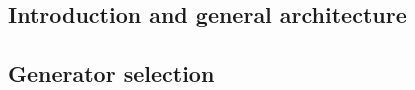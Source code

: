 \documentclass[../TFG_Report.tex]{subfiles}
\begin{document}
	
	\subsection{Introduction and general architecture}
	
	
	
	\subsection{Generator selection}
	
\end{document}
